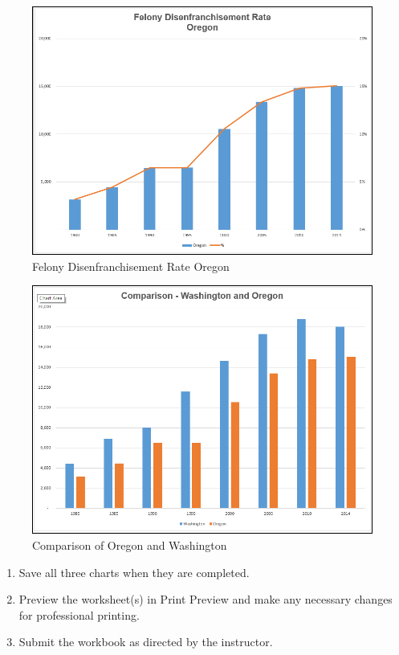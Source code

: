 \begin{figure}[H]
	\centering
	\includegraphics[width=\maxwidth{.95\linewidth}]{gfx/ch04_fig58}
	\caption{Felony Disenfranchisement Rate Oregon}
	\label{04:fig58}
\end{figure}

\begin{figure}[H]
	\centering
	\includegraphics[width=\maxwidth{.95\linewidth}]{gfx/ch04_fig59}
	\caption{Comparison of Oregon and Washington}
	\label{04:fig59}
\end{figure}


\begin{enumerate}
	\item Save all three charts when they are completed. 
	\item Preview the worksheet(s) in Print Preview and make any necessary changes for professional printing.
	\item Submit the  workbook as directed by the instructor.
\end{enumerate}